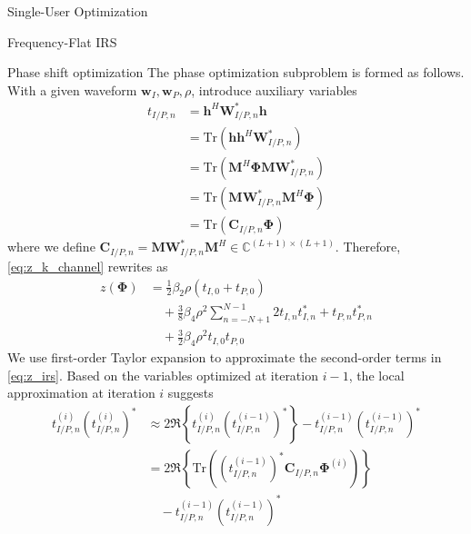 \documentclass{IEEEtran}
\begin{document}
\begin{section}{Single-User Optimization}
\begin{subsection}{Frequency-Flat IRS}
		\begin{subsubsection}{Phase shift optimization}\label{se:fs_irs}
			The phase optimization subproblem is formed as follows. With a given waveform $\boldsymbol{w}_I,\boldsymbol{w}_P,\rho$, introduce auxiliary variables
			\begin{equation}\label{eq:t}
				\begin{split}
					t_{I/P,n}
					&=\boldsymbol{h}^H\boldsymbol{W}_{I/P,n}^*\boldsymbol{h}\\
					&=\mathrm{Tr}(\boldsymbol{h}\boldsymbol{h}^H\boldsymbol{W}_{I/P,n}^*)\\
					&=\mathrm{Tr}(\boldsymbol{M}^H\boldsymbol{\Phi}\boldsymbol{M}\boldsymbol{W}_{I/P,n}^*)\\
					&=\mathrm{Tr}(\boldsymbol{M}\boldsymbol{W}_{I/P,n}^*\boldsymbol{M}^H\boldsymbol{\Phi})\\
					&=\mathrm{Tr}(\boldsymbol{C}_{I/P,n}\boldsymbol{\Phi})
				\end{split}
			\end{equation}
			where we define $\boldsymbol{C}_{I/P,n}=\boldsymbol{M}\boldsymbol{W}_{I/P,n}^*\boldsymbol{M}^H \in \mathbb{C}^{(L+1)\times(L+1)}$. Therefore, \ref{eq:z_k_channel} rewrites as
			\begin{equation}\label{eq:z_irs}
				\begin{split}
					z(\boldsymbol{\Phi})
					&=\frac{1}{2}{\beta_2}{\rho}(t_{I,0}+t_{P,0})\\
					&\quad+\frac{3}{8}{\beta_4}{\rho^2}\sum_{n=-N+1}^{N-1}{2t_{I,n}t_{I,n}^*+t_{P,n}t_{P,n}^*}\\
					&\quad+\frac{3}{2}{\beta_4}{\rho^2}t_{I,0}t_{P,0}
				\end{split}
			\end{equation}
			We use first-order Taylor expansion to approximate the second-order terms in \ref{eq:z_irs}. Based on the variables optimized at iteration $i - 1$, the local approximation at iteration $i$ suggests \cite{Adali2010}
			\begin{equation}
				\begin{split}
					t_{I/P,n}^{(i)} (t_{I/P,n}^{(i)})^*
					& \approx 2 \Re\left\{t_{I/P,n}^{(i)} (t_{I/P,n}^{(i-1)})^*\right\} - t_{I/P,n}^{(i-1)} (t_{I/P,n}^{(i-1)})^* \\
					& = 2 \Re \left\{\mathrm{Tr}\left((t_{I/P,n}^{(i-1)})^*\boldsymbol{C}_{I/P,n}\boldsymbol{\Phi}^{(i)}\right)\right\}\\
					& \quad - t_{I/P,n}^{(i-1)} (t_{I/P,n}^{(i-1)})^*\\

\end{split}
\end{equation}
\end{subsubsection}
\end{subsection}
\end{section}
\end{document}
